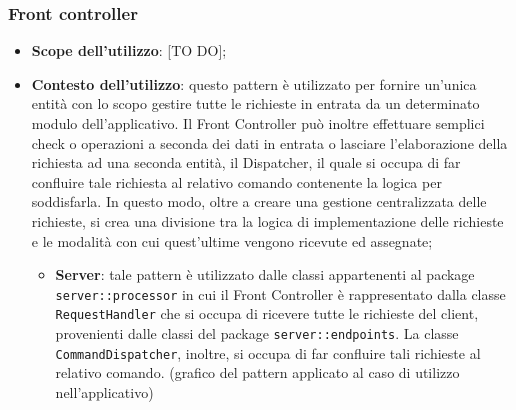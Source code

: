 	\subsubsection{Front controller} %
	\label{ssub:front_controller}
		\begin{itemize}
			\item \textbf{Scope dell'utilizzo}: [TO DO];
			\item \textbf{Contesto dell'utilizzo}: questo pattern è utilizzato per fornire un'unica entità con lo scopo gestire tutte le richieste in entrata da un determinato modulo dell'applicativo. Il Front Controller può inoltre effettuare semplici check o operazioni a seconda dei dati in entrata o lasciare l'elaborazione della richiesta ad una seconda entità, il Dispatcher, il quale si occupa di far confluire tale richiesta al relativo comando contenente la logica per soddisfarla. In questo modo, oltre a creare una gestione centralizzata delle richieste, si crea una divisione tra la logica di implementazione delle richieste e le modalità con cui quest'ultime vengono ricevute ed assegnate;
				\begin{itemize}
					\item \textbf{Server}: tale pattern è utilizzato dalle classi appartenenti al package \texttt{server::processor} in cui il Front Controller è rappresentato dalla classe \texttt{RequestHandler} che si occupa di ricevere tutte le richieste del client, provenienti dalle classi del package	\texttt{server::endpoints}. La classe \newline \texttt{CommandDispatcher}, inoltre, si occupa di far confluire tali richieste al relativo comando. \newline
					[TO DO] (grafico del pattern applicato al caso di utilizzo nell'applicativo)
				\end{itemize}
		\end{itemize}



